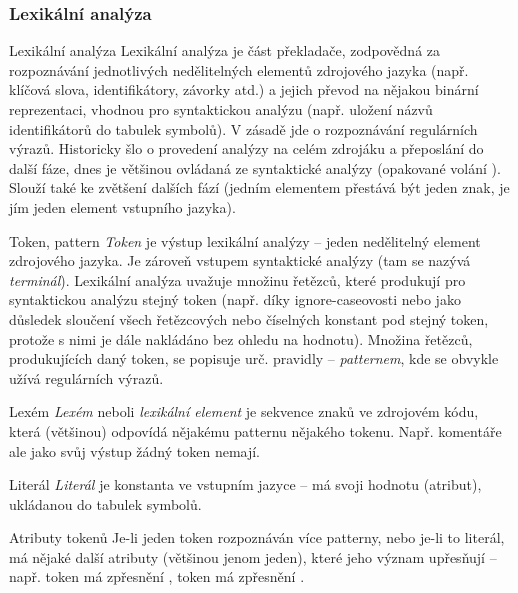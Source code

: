 \subsubsection*{Lexikální analýza}

\begin{definiceN}{Lexikální analýza}
Lexikální analýza je část překladače, zodpovědná za rozpoznávání jednotlivých nedělitelných elementů zdrojového jazyka (např. klíčová slova, identifikátory, závorky atd.) a jejich převod na nějakou binární reprezentaci, vhodnou pro syntaktickou analýzu (např. uložení názvů identifikátorů do tabulek symbolů). V zásadě jde o rozpoznávání regulárních výrazů. Historicky šlo o provedení analýzy na celém zdrojáku a přeposlání do další fáze, dnes je většinou ovládaná ze syntaktické analýzy (opakované volání ). Slouží také ke zvětšení  dalších fází (jedním elementem přestává být jeden znak, je jím jeden element vstupního jazyka).
\end{definiceN}

\begin{definiceN}{Token, pattern}
\emph{Token} je výstup lexikální analýzy -- jeden nedělitelný element zdrojového jazyka. Je zároveň vstupem syntaktické analýzy (tam se nazývá \emph{terminál}). Lexikální analýza uvažuje množinu řetězců, které produkují pro syntaktickou analýzu stejný token (např. díky ignore-caseovosti nebo jako důsledek sloučení všech řetězcových nebo číselných konstant pod stejný token, protože s nimi je dále nakládáno bez ohledu na hodnotu). Množina řetězců, produkujících daný token, se popisuje urč. pravidly -- \emph{patternem}, kde se obvykle užívá regulárních výrazů.
\end{definiceN}

\begin{definiceN}{Lexém}
\emph{Lexém} neboli \emph{lexikální element} je sekvence znaků ve zdrojovém kódu, která (většinou) odpovídá nějakému patternu nějakého tokenu. Např. komentáře ale jako svůj výstup žádný token nemají.
\end{definiceN}

\begin{definiceN}{Literál}
\emph{Literál} je konstanta ve vstupním jazyce -- má svoji hodnotu (atribut), ukládanou do tabulek symbolů.
\end{definiceN}

\begin{poznamkaN}{Atributy tokenů}
Je-li jeden token rozpoznáván více patterny, nebo je-li to literál, má nějaké další atributy (většinou jenom jeden), které jeho význam upřesňují -- např. token  má zpřesnění , token  má zpřesnění .
\end{poznamkaN}

